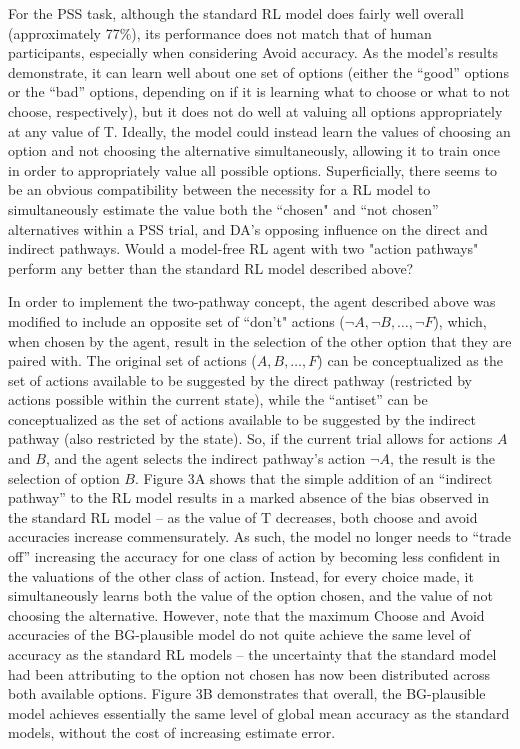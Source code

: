 \documentclass[10pt,letterpaper]{article}
\begin{document}
For the PSS task, although the standard RL model does fairly well overall (approximately 77\%), its performance does not match that of human participants, especially when considering Avoid accuracy. As the model’s results demonstrate, it can learn well about one set of options (either the “good” options or the “bad” options, depending on if it is learning what to choose or what to not choose, respectively), but it does not do well at valuing all options appropriately at any value of T. Ideally, the model could instead learn the values of choosing an option and not choosing the alternative simultaneously, allowing it to train once in order to appropriately value all possible options. Superficially, there seems to be an obvious compatibility between the necessity for a RL model to simultaneously estimate the value both the ``chosen" and ``not chosen'' alternatives within a PSS trial, and DA’s opposing influence on the direct and indirect pathways. Would a model-free RL agent with two "action pathways" perform any better than the standard RL model described above?

In order to implement the two-pathway concept, the agent described above was modified to include an opposite set of ``don't" actions ($\neg A, \neg B, \dots, \neg F$), which, when chosen by the agent, result in the selection of the other option that they are paired with. The original set of actions ($A, B, \dots, F$) can be conceptualized as the set of actions available to be suggested by the direct pathway (restricted by actions possible within the current state), while the “antiset” can be conceptualized as the set of actions available to be suggested by the indirect pathway (also restricted by the state). So, if the current trial allows for actions $A$ and $B$, and the agent selects the indirect pathway’s action $\neg A$, the result is the selection of option $B$. Figure 3A shows that the simple addition of an “indirect pathway” to the RL model results in a marked absence of the bias observed in the standard RL model – as the value of T decreases, both choose and avoid accuracies increase commensurately. As such, the model no longer needs to “trade off” increasing the accuracy for one class of action by becoming less confident in the valuations of the other class of action. Instead, for every choice made, it simultaneously learns both the value of the option chosen, and the value of not choosing the alternative. However, note that the maximum Choose and Avoid accuracies of the BG-plausible model do not quite achieve the same level of accuracy as the standard RL models – the uncertainty that the standard model had been attributing to the option not chosen has now been distributed across both available options.  Figure 3B demonstrates that overall, the BG-plausible model achieves essentially the same level of global mean accuracy as the standard models, without the cost of increasing estimate error.  
\end{document}
